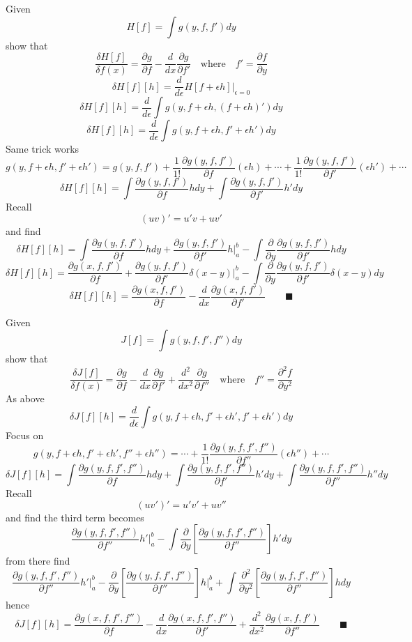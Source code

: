 \documentclass{memoir}
\begin{document}
Given \[H[f]=\int g(y,f,f')dy\]
show that \[\frac{\delta H[f]}{\delta f(x)}=\frac{\partial g}{\partial f} -\frac{d}{dx}\frac{\partial g}{\partial f'} \quad\text{where}\quad f'=\frac{\partial f}{\partial y}\]
\[\delta H[f][h]=\frac{d}{d\epsilon}H[f+\epsilon h]\Big\vert_{\epsilon=0}\]
\[\delta H[f][h]=\frac{d}{d\epsilon}\int g(y,f+\epsilon h,(f+\epsilon h)')dy\]
\[\delta H[f][h]=\frac{d}{d\epsilon}\int g\left(y,f+\epsilon h,f'+\epsilon h'\right)dy\]
Same trick works \[g(y,f+\epsilon h,f'+\epsilon h')=g(y,f,f')+\frac{1}{1!}\frac{\partial g(y,f,f')}{\partial f}(\epsilon h) + \cdots +\frac{1}{1!}\frac{\partial g(y,f,f')}{\partial f'}(\epsilon h') + \cdots \]
\[\delta H[f][h]=\int\frac{\partial g(y,f,f')}{\partial f}hdy+\int\frac{\partial g(y,f,f')}{\partial f' }h'dy\] Recall \[(uv)'=u'v+uv'\] and find
\[\delta H[f][h]=\int\frac{\partial g(y,f,f')}{\partial f}hdy+\frac{\partial g(y,f,f')}{\partial f'}h\Big \vert_a^b-\int\frac{\partial}{\partial y}\frac{\partial g(y,f,f')}{\partial f'}hdy\]
\[\delta H[f][h]=\frac{\partial g(x,f,f')}{\partial f}+\frac{\partial g(y,f,f')}{\partial f'}\delta(x-y)\Big \vert_a^b-\int\frac{\partial}{\partial y}\frac{\partial g(y,f,f')}{\partial f'}\delta(x-y)dy\]
\[\delta H[f][h]=\frac{\partial g(x,f,f')}{\partial f}-\frac{d}{dx}\frac{\partial g(x,f,f')}{\partial f'} \qquad \blacksquare\]

Given \[J[f]=\int g(y,f,f',f'')dy\]
show that \[\frac{\delta J[f]}{\delta f(x)}=\frac{\partial g}{\partial f} -\frac{d}{dx}\frac{\partial g}{\partial f'}+\frac{d^2}{dx^2}\frac{\partial g}{\partial f''} \quad\text{where}\quad f''=\frac{\partial^2 f}{\partial y^2}\]
As above \[\delta J[f][h]=\frac{d}{d\epsilon}\int g\left(y,f+\epsilon h,f'+\epsilon h',f'+\epsilon h'\right)dy\]
Focus on \[g(y,f+\epsilon h,f'+\epsilon h',f''+\epsilon h'')= \cdots +\frac{1}{1!}\frac{\partial g(y,f,f',f'')}{\partial f''}(\epsilon h'') + \cdots \]
\[\delta J[f][h]=\int\frac{\partial g(y,f,f',f'')}{\partial f}hdy+\int\frac{\partial g(y,f,f',f'')}{\partial f'}h'dy+\int\frac{\partial g(y,f,f',f'')}{\partial f''}h''dy\] Recall \[(uv')'=u'v'+uv''\] and find the third term becomes
\[\frac{\partial g(y,f,f',f'')}{\partial f''}h'\Big \vert_a^b-\int\frac{\partial}{\partial y}\left[\frac{\partial g(y,f,f',f'')}{\partial f''}\right]h'dy\]
from there find
\[\frac{\partial g(y,f,f',f'')}{\partial f''}h'\Big \vert_a^b-\frac{\partial}{\partial y}\left[\frac{\partial g(y,f,f',f'')}{\partial f''}\right]h\Big \vert_a^b+\int\frac{\partial^2}{\partial y^2}\left[\frac{\partial g(y,f,f',f'')}{\partial f''}\right]hdy\]
hence
\[\delta J[f][h]=\frac{\partial g(x,f,f',f'')}{\partial f}-\frac{d}{dx}\frac{\partial g(x,f,f',f'')}{\partial f'}+\frac{d^2}{dx^2}\frac{\partial g(x,f,f')}{\partial f''} \qquad \blacksquare\]
\end{document}
